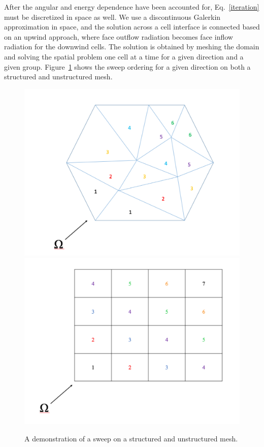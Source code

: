 \documentclass{anstrans}
\begin{document}
After the angular and energy dependence have been accounted for, Eq.~\eqref{iteration} must be discretized in space as well. We use a discontinuous Galerkin approximation in space,  and the solution across a cell interface is connected based on an upwind approach, where face outflow radiation becomes face inflow radiation for the downwind cells. The solution is obtained by meshing the domain and solving the spatial problem one cell at a time for a given direction and a given group. 
Figure~\ref{sweeps} shows the sweep ordering for a given direction on both a structured and unstructured mesh.

\begin{figure}
\centering
\includegraphics[scale = 0.27]{figures/UnstructureMesh.pdf}
\includegraphics[scale = 0.27]{figures/StructuredMesh.pdf}
\caption{A demonstration of a sweep on a structured and unstructured mesh. }
\label{sweeps}
\end{figure}
\end{document}
